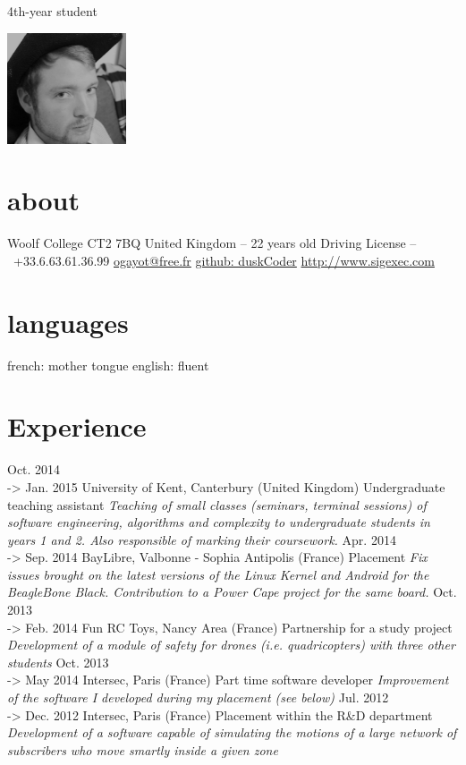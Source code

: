 \documentclass[]{friggeri-cv}
\begin{document}
       {4th-year student}


\begin{aside}
    \includegraphics[width=100pt]{photo.png}
  \section{about}
    Woolf College
    CT2 7BQ
    United Kingdom
    --
    22 years old
    Driving License
    --
    ~
    \phone \ +33.6.63.61.36.99
    \href{mailto:ogayot@free.fr}{ogayot@free.fr}
    \href{https://github.com/duskCoder}{github: duskCoder}
    \href{http://www.sigexec.com}{http://www.sigexec.com}
  \section{languages}
    french: mother tongue
    english: fluent
\end{aside}

\section{Experience}

\begin{entrylist}

    \entry
    {Oct. 2014 \\-> Jan. 2015}
    {University of Kent, Canterbury (United Kingdom)}
    {Undergraduate teaching assistant}
    {\emph{Teaching of small classes (seminars, terminal sessions) of software engineering, algorithms and complexity to undergraduate students in years 1 and 2. Also responsible of marking their coursework.}}
  \entry
    {Apr. 2014 \\-> Sep. 2014}
    {BayLibre, Valbonne - Sophia Antipolis (France)}
    {Placement}
    {\emph{Fix issues brought on the latest versions of the Linux Kernel and Android for the BeagleBone Black. Contribution to a Power Cape project for the same board.}}
  \entry
    {Oct. 2013 \\-> Feb. 2014}
    {Fun RC Toys, Nancy Area (France)}
    {Partnership for a study project}
    {\emph{Development of a module of safety for drones (i.e. quadricopters) with three other students}}
  \entry
    {Oct. 2013 \\-> May 2014}
    {Intersec, Paris (France)}
    {Part time software developer}
    {\emph{Improvement of the software I developed during my placement (see below)}}
  \entry
    {Jul. 2012 \\-> Dec. 2012}
    {Intersec, Paris (France)}
    {Placement within the R\&D department}
    {\emph{Development of a software capable of simulating the motions of a large network of subscribers who move smartly inside a given zone}}
\end{entrylist}
\end{document}
